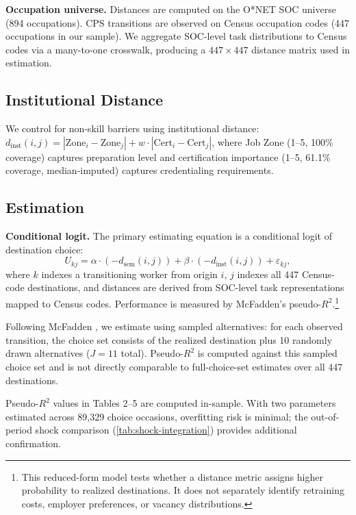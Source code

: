 \documentclass[12pt]{article}
\begin{document}
\textbf{Occupation universe.} Distances are computed on the O*NET SOC universe (894 occupations). CPS transitions are observed on Census occupation codes (447 occupations in our sample). We aggregate SOC-level task distributions to Census codes via a many-to-one crosswalk, producing a $447 \times 447$ distance matrix used in estimation.


\subsection{Institutional Distance}
\label{subsec:institutional-distance}

We control for non-skill barriers using institutional distance:
$d_{\mathrm{inst}}(i,j) = |\mathrm{Zone}_i - \mathrm{Zone}_j| + w \cdot |\mathrm{Cert}_i - \mathrm{Cert}_j|$,
where Job Zone (1--5, 100\% coverage) captures preparation level and certification importance (1--5, 61.1\% coverage, median-imputed) captures credentialing requirements.


\subsection{Estimation}
\label{subsec:estimation}

\textbf{Conditional logit.} The primary estimating equation is a conditional logit of destination choice:
\[
U_{kj} = \alpha \cdot (-d_{\mathrm{sem}}(i,j)) + \beta \cdot (-d_{\mathrm{inst}}(i,j)) + \varepsilon_{kj},
\]
where $k$ indexes a transitioning worker from origin $i$, $j$ indexes all 447 Census-code destinations, and distances are derived from SOC-level task representations mapped to Census codes. Performance is measured by McFadden's pseudo-$R^2$.\footnote{This reduced-form model tests whether a distance metric assigns higher probability to realized destinations. It does not separately identify retraining costs, employer preferences, or vacancy distributions.}

Following McFadden \cite{McFadden1978}, we estimate using sampled alternatives: for each observed transition, the choice set consists of the realized destination plus 10 randomly drawn alternatives ($J = 11$ total). Pseudo-$R^2$ is computed against this sampled choice set and is not directly comparable to full-choice-set estimates over all 447 destinations.

Pseudo-$R^2$ values in Tables 2--5 are computed in-sample. With two parameters estimated across 89,329 choice occasions, overfitting risk is minimal; the out-of-period shock comparison (\cref{tab:shock-integration}) provides additional confirmation.
\end{document}
